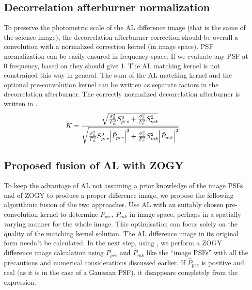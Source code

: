 \subsection{Decorrelation afterburner normalization}
\par To preserve the photometric scale of the AL difference image
(that is the same of the science image), the decorrelation afterburner
correction should be overall a convolution with a normalized
correction kernel (in image space). PSF normalization can be easily
ensured in frequency space. If we evaluate any PSF at 0 frequency,
based on  they should give 1. The AL matching kernel is
not constrained this way in general. The sum of the AL matching kernel
and the optional pre-convolution kernel can be written as separate
factors in the decorrelation afterburner. The correctly normalized
decorrelation afterburner is written in .
%
\begin{align}
  \hat{K} &= \frac{\sqrt{\frac{\sigma_n^2}{F_n^2}S_{pre}^2 + \frac{\sigma_r^2}{F_r^2}S_{mk}^2}}
  {\sqrt{\frac{\sigma_n^2}{F_n^2}S_{pre}^2\abs{\hat{P}_{pre}}^2 + \frac{\sigma_r^2}{F_r^2}S_{mk}^2
  \abs{\hat{P}_{mk}}^2}}
\label{eq:KPre}
\end{align}
\subsection{Proposed fusion of AL with ZOGY}
To keep the advantage of AL not assuming a prior knowledge of the
image PSFs and of ZOGY to produce a proper difference image, we
propose the following algorithmic fusion of the two approaches. Use AL
with an suitably chosen pre-convolution kernel to determine
\(P_{pre}\), \(P_{mk}\) in image space, perhaps in a spatially varying
manner for the whole image. This optimisation can focus solely on the
quality of the matching kernel solution. The AL difference image in
its original  form needn't be calculated. In the next
step, using , we perform a ZOGY difference image
calculation using \(\hat{P}_{pre}\) and \(\hat{P}_{mk}\) like the
``image PSFs'' with all the precautions and numerical considerations
discussed earlier. If \(\hat{P}_{pre}\) is positive and real (as it is
in the case of a Gaussian PSF), it disappears completely from the
expression.
%
